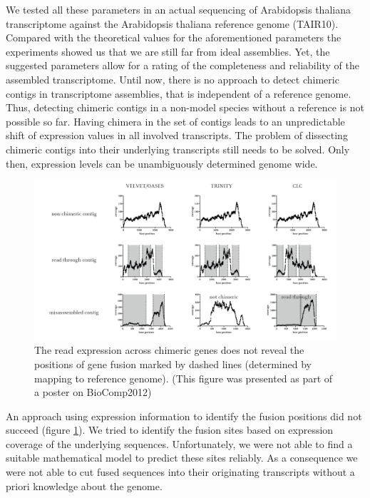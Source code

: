 		We tested all these parameters in an actual sequencing of Arabidopsis thaliana transcriptome against the Arabidopsis thaliana reference genome (TAIR10).
		Compared with the theoretical values for the aforementioned parameters the experiments showed us that we are still far from ideal assemblies.
		Yet, the suggested parameters allow for a rating of the completeness and reliability of the assembled transcriptome.
		Until now, there is no approach to detect chimeric contigs in transcriptome assemblies, that is independent of a reference genome.
		Thus, detecting chimeric contigs in a non-model species without a reference is not possible so far.
		Having chimera in the set of contigs leads to an unpredictable shift of expression values in all involved transcripts.
		The problem of dissecting chimeric contigs into their underlying transcripts still needs to be solved.
		Only then, expression levels can be unambiguously determined genome wide.
		
				\begin{figure}%
					\includegraphics[width=\columnwidth]{images/conclusions_chimeraByExpression}%
					\caption{The read expression across chimeric genes does not reveal the positions of gene fusion marked by dashed lines (determined by mapping to reference genome). (This figure was presented as part of a poster on BioComp2012)}%
					\label{fig:conclusions_chimeraByExpression}%
				\end{figure}
		An approach using expression information to identify the fusion positions did not succeed (figure \ref{fig:conclusions_chimeraByExpression}).
		We tried to identify the fusion sites based on expression coverage of the underlying sequences.
		Unfortunately, we were not able to find a suitable mathematical model to predict these sites reliably.
		As a consequence we were not able to cut fused sequences into their originating transcripts without a priori knowledge about the genome.
		
